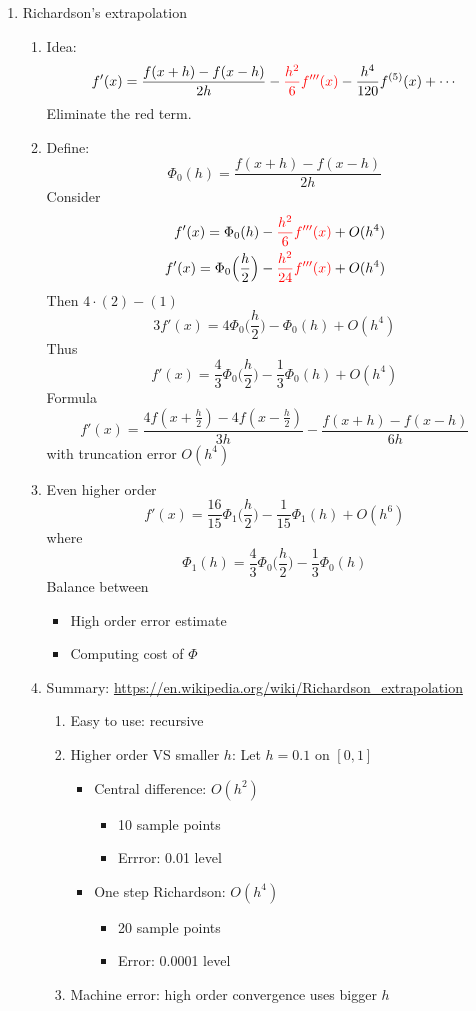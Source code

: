 \documentclass{article}
\theoremstyle{remark}
\begin{document}
\begin{enumerate}
\item Richardson's extrapolation
\begin{enumerate}
\item Idea:
$$
f'(x) = \frac{f(x+h)-f(x-h)}{2h} - {\color{red}\frac{h^2}{6}f'''(x)}-\frac{h^4}{120}f^{(5)}(x) + \cdots
$$
Eliminate the red term.
\item Define:
$$
\Phi_0(h) = \frac{f(x+h)-f(x-h)}{2h}
$$
Consider
\begin{eqnarray}
f'(x) = \Phi_0(h) -{\color{red}\frac{h^2}{6}f'''(x)}+O(h^4)\\
f'(x) = \Phi_0\Big(\frac{h}{2}\Big) -{\color{red}\frac{h^2}{24}f'''(x)}+O(h^4)
\end{eqnarray}
Then $4\cdot (2) - (1)$
$$
3f'(x) = 4\Phi_0\Big(\frac{h}{2}\Big) - \Phi_0(h) +O(h^4)
$$
Thus
$$
f'(x) = \frac{4}{3}\Phi_0\Big(\frac{h}{2}\Big) - \frac{1}{3}\Phi_0(h) +O(h^4)
$$
Formula
$$
f'(x) = \frac{4f(x+\frac{h}{2})-4f(x-\frac{h}{2})}{3h}
 - \frac{f(x+h)-f(x-h)}{6h}
$$
with truncation error $O(h^4)$
\item Even higher order
$$
f'(x) = \frac{16}{15}\Phi_1\Big(\frac{h}{2}\Big)-\frac{1}{15}\Phi_1(h) + O(h^6)
$$
where
$$
\Phi_1(h) = \frac{4}{3}\Phi_0\Big(\frac{h}{2}\Big) - \frac{1}{3}\Phi_0(h)
$$
Balance between
\begin{itemize}
\item High order error estimate
\item Computing cost of $\Phi$
\end{itemize}
\item Summary:
\url{https://en.wikipedia.org/wiki/Richardson_extrapolation}
\begin{enumerate}
\item Easy to use: recursive
\item Higher order VS smaller $h$: Let $h = 0.1$ on $[0,1]$
\begin{itemize}
\item Central difference: $O(h^2)$
\begin{itemize}
\item 10 sample points
\item Errror: 0.01 level
\end{itemize}
\item One step Richardson: $O(h^4)$
\begin{itemize}
\item 20 sample points
\item Error: 0.0001 level
\end{itemize}
\end{itemize}
\item Machine error: high order convergence uses bigger $h$
\end{enumerate}

\end{enumerate}
\end{enumerate}
\end{document}
